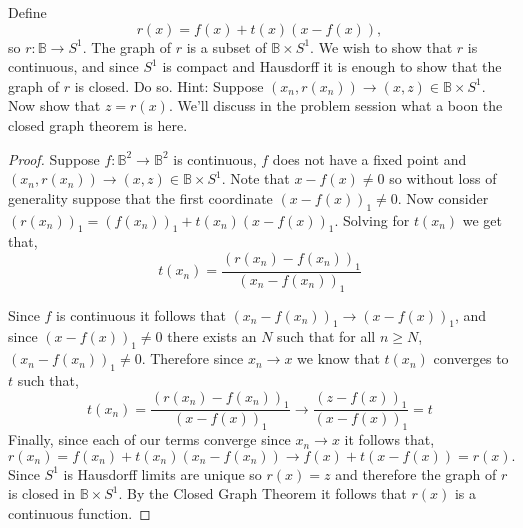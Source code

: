 \documentclass{homework651}
\newcommand{\bbB}{\mathbb{B}}
\begin{document}
\begin{problems}
\begin{subproblems}
\item Define
\[
r(x) = f(x)+t(x)(x-f(x)),
\]
so $r:\bbB\to S^1$.  The graph of $r$ is a subset of $\bbB\times S^1$.  
We wish to show that $r$ is continuous, and since $S^1$ is compact and Hausdorff
it is enough to show that the graph of $r$ is closed.  Do so.  Hint:
Suppose $(x_n,r(x_n))\to (x,z)\in \bbB\times S^1$.  Now show that $z=r(x)$.
We'll discuss in the problem session what a boon the closed graph theorem is here.
\begin{proof} Suppose $f:\bbB^2 \to \bbB^2$ is
    continuous, $f$ does not have a fixed point and $(x_n,r(x_n))\to (x,z)\in \bbB\times S^1$. Note 
    that $x - f(x) \neq 0$ so without loss of generality suppose that the first coordinate $(x - f(x))_1 \neq 0$. 
    Now consider $(r(x_n))_1 = (f(x_n))_1 + t(x_n)(x - f(x))_1$. Solving for $t(x_n)$ we get that, 
    \begin{equation*}
        t(x_n) = \frac{(r(x_n) - f(x_n))_1}{(x_n - f(x_n))_1}
    \end{equation*}

    Since $f$ is continuous it follows that $(x_n - f(x_n))_1 \to (x - f(x))_1$, and since  $(x - f(x))_1 \neq 0$
    there exists an $N$ such that for all $n \geq N$, $(x_n - f(x_n))_1 \neq 0$. Therefore since $x_n \to x$ we know that $t(x_n)$ converges to $t$
    such that, 
    \begin{equation*}
        t(x_n) =  \frac{(r(x_n) - f(x_n))_1}{(x - f(x))_1} \to \frac{(z - f(x))_1}{(x - f(x))_1}  = t
    \end{equation*}
    Finally, since each of our terms converge since $x_n \to x$ it follows that,
    \begin{equation*}
        r(x_n) =  f(x_n) + t(x_n)(x_n - f(x_n)) \to  f(x) + t(x - f(x)) = r(x).
    \end{equation*}
    Since $S^1$ is Hausdorff limits are unique so $r(x) = z$ and therefore the graph of $r$ is closed in $\bbB \times S^1$. 
    By the Closed Graph Theorem it follows that $r(x)$ is a continuous function. 

\end{proof}
\end{subproblems}







\end{problems}
\end{document}
